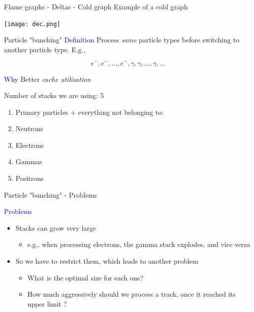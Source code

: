 \documentclass{beamer}
\begin{document}
\begin{frame}{Flame graphs - Deltas - Cold graph}
Example of a cold graph

\begin{center}
  \texttt{[image: dec.png]}
\end{center}
\end{frame}

\begin{frame}{Particle "bunching"}
\textcolor{blue}{Definition}
Process \textit{same} particle types before switching to another particle type. E.g.,

\begin{equation*}
e^-, e^-, \ldots, e^-, \gamma, \gamma, \ldots, \gamma, \ldots
\end{equation*}

\textcolor{blue}{Why} Better \textit{cache utilisation}

\vspace{5 mm}

Number of stacks we are using: 5

\begin{enumerate}
\item Primary particles + everything not belonging to:
\item Neutrons
\item Electrons
\item Gammas
\item Positrons
\end{enumerate}
\end{frame}

\begin{frame}{Particle "bunching" - Problems}

\textcolor{blue}{Problems}
\begin{itemize}
\item Stacks can grow very large
\begin{itemize}
\item e.g., when processing electrons, the gamma stack explodes, and vice versa
\end{itemize}
\item So we have to restrict them, which leads to another problem
\begin{itemize}
\item What is the optimal size for each one?
\item How much aggressively should we process a track, once it reached its upper limit ?
\end{itemize}
\end{itemize}
\end{frame}
\end{document}
